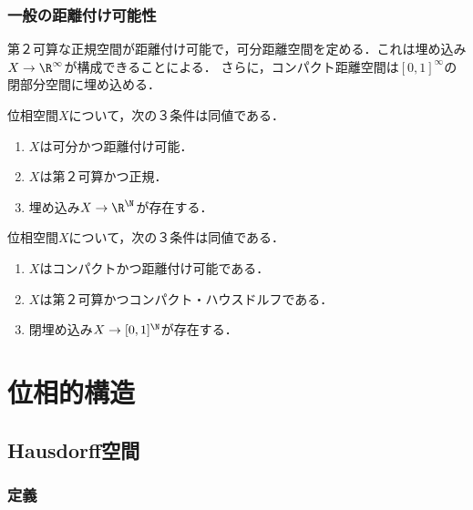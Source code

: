 \documentclass[uplatex,dvipdfmx]{jsreport}
\begin{document}
\subsection{一般の距離付け可能性}

\begin{tcolorbox}[colframe=ForestGreen, colback=ForestGreen!10!white,breakable,colbacktitle=ForestGreen!40!white,coltitle=black,fonttitle=\bfseries\sffamily,
title=]
    第２可算な正規空間が距離付け可能で，可分距離空間を定める．これは埋め込み$X\to\R^\infty$が構成できることによる．
    さらに，コンパクト距離空間は$[0,1]^\infty$の閉部分空間に埋め込める．
\end{tcolorbox}

\begin{theorem}[Urysohnの距離付け定理]
    位相空間$X$について，次の３条件は同値である．
    \begin{enumerate}
        \item $X$は可分かつ距離付け可能．
        \item $X$は第２可算かつ正規．
        \item 埋め込み$X\to\R^\N$が存在する．
    \end{enumerate}
\end{theorem}

\begin{corollary}[AC, コンパクト距離空間は閉区間の可算積の閉部分空間と同相である]
    位相空間$X$について，次の３条件は同値である．
    \begin{enumerate}
        \item $X$はコンパクトかつ距離付け可能である．
        \item $X$は第２可算かつコンパクト・ハウスドルフである．
        \item 閉埋め込み$X\to[0,1]^\N$が存在する．
    \end{enumerate}
\end{corollary}

\chapter{位相的構造}

\section{Hausdorff空間}

\subsection{定義}
\end{document}
